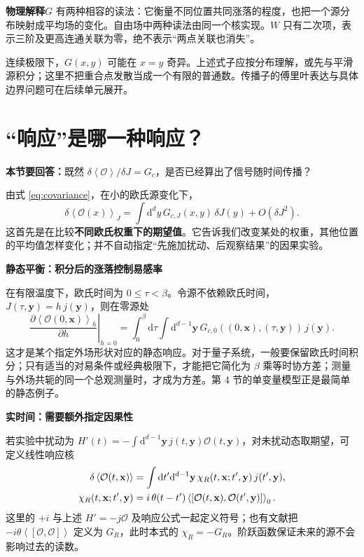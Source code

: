 \documentclass[11pt,a4paper]{article}
\newcommand{\dd}{\mathrm d}
\newcommand{\OO}{\mathcal O}
\newcommand{\avg}[1]{\left\langle #1\right\rangle}
\newcommand{\physicsnote}[1]{\par\smallskip\noindent\colorbox{pale}{\parbox{\dimexpr\linewidth-2\fboxsep\relax}{\textbf{物理解释}\quad #1}}\par\smallskip}
\newcommand{\question}[1]{\textbf{本节要回答：}#1\par}
\newcommand{\step}[1]{\textbf{#1}\par}
\begin{document}
\physicsnote{\(G\) 有两种相容的读法：它衡量不同位置共同涨落的程度，也把一个源分布映射成平均场的变化。自由场中两种读法由同一个核实现。\(W\) 只有二次项，表示三阶及更高连通关联为零，绝不表示“两点关联也消失”。}
连续极限下，\(G(x,y)\) 可能在 \(x=y\) 奇异。上述式子应按分布理解，或先与平滑源积分；这里不把重合点发散当成一个有限的普通数。传播子的傅里叶表达与具体边界问题可在后续单元展开。

\newpage
\section{“响应”是哪一种响应？}
\question{既然 \(\delta\avg{\OO}/\delta J=G_c\)，是否已经算出了信号随时间传播？}
由式 \eqref{eq:covariance}，在小的欧氏源变化下，
\begin{equation}\label{eq:linear}
 \delta\avg{\OO(x)}_J
 =\int\dd^d y\,G_{c,J}(x,y)\,\delta J(y)+O(\delta J^2).
\end{equation}
这首先是在比较\textbf{不同欧氏权重下的期望值}。它告诉我们改变某处的权重，其他位置的平均值怎样变化；并不自动指定“先施加扰动、后观察结果”的因果实验。

\step{静态平衡：积分后的涨落控制易感率}
在有限温度下，欧氏时间为 \(0\leq\tau<\beta\)。令源不依赖欧氏时间，\(J(\tau,\mathbf y)=h\,j(\mathbf y)\)，则在零源处
\begin{equation}
 \left.\frac{\partial\avg{\OO(0,\mathbf x)}_h}{\partial h}\right|_{h=0}
 =\int_0^\beta\dd\tau\int\dd^{d-1}\mathbf y\,
 G_{c,0}((0,\mathbf x),(\tau,\mathbf y))\,j(\mathbf y).
\end{equation}
这才是某个指定外场形状对应的静态响应。对于量子系统，一般要保留欧氏时间积分；只有适当的对易条件或经典极限下，才能把它简化为 \(\beta\) 乘等时协方差；测量与外场共轭的同一个总观测量时，才成为方差。第 4 节的单变量模型正是最简单的静态例子。

\step{实时间：需要额外指定因果性}
若实验中扰动为
\(H'(t)=-\int\dd^{d-1}\mathbf y\,j(t,\mathbf y)\OO(t,\mathbf y)\)，对未扰动态取期望，可定义线性响应核
\begin{align}
 \delta\avg{\OO(t,\mathbf x)}
 &=\int\dd t'\dd^{d-1}\mathbf y\,
 \chi_R(t,\mathbf x;t',\mathbf y)\,j(t',\mathbf y),\notag\\
 \chi_R(t,\mathbf x;t',\mathbf y)
 &=i\,\theta(t-t')\avg{[\OO(t,\mathbf x),\OO(t',\mathbf y)]}_0.
\end{align}
这里的 \(+i\) 与上述 \(H'=-j\OO\) 及响应公式一起定义符号；也有文献把 \(-i\theta\avg{[\OO,\OO]}\) 定义为 \(G_R\)，此时本式的 \(\chi_R=-G_R\)。阶跃函数保证未来的源不会影响过去的读数。
\end{document}
